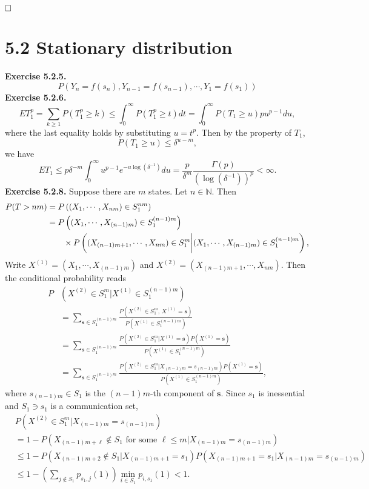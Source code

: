 \documentclass[12pt]{extarticle}
\begin{document}
$\hspace{\fill}\square$\\

\newpage
\section*{5.2 Stationary distribution}
\textbf{Exercise 5.2.5.}
\[
P(Y_n=f(s_n),Y_{n-1}=f(s_{n-1}),\cdots,Y_1=f(s_1))
\]
\textbf{Exercise 5.2.6.}
\[
ET_1^p=\sum_{k\geq 1}P(T_1^p\geq k)
\leq
\int_0^\infty P(T_1^p\geq t)dt
=
\int_0^\infty P(T_1\geq u)pu^{p-1}du,
\]
where the last equality holds by substituting $u=t^p$. 
Then by the property of $T_1$,
\[
P(T_1\geq u)\leq \delta^{u-m},
\]
we have
\[
ET_1\leq
p\delta^{-m}
\int_0^\infty
u^{p-1}e^{-u\log(\delta^{-1})}du
=
\frac{p}{\delta^m}\frac{\Gamma(p)}{\left(\log(\delta^{-1})\right)^p}<\infty.
\]
\textbf{Exercise 5.2.8.}
Suppose there are $m$ states. Let $n\in\mathbb{N}$. Then
\[
\begin{aligned}
P(T>nm)&=P\left((X_1,\cdots,X_{nm})\in S_1^{nm}\right) \\&
=P\left((X_1,\cdots,X_{(n-1)m})\in S_1^{(n-1)m}\right) \\&\hspace{7mm}
\times
P\left((X_{(n-1)m+1},\cdots,X_{nm})\in S_1^m
\bigg|
(X_1,\cdots,X_{(n-1)m})\in S_1^{(n-1)m}\right),
\end{aligned}
\]
Write $X^{(1)}=(X_1,\cdots,X_{(n-1)m})$ and $X^{(2)}=(X_{(n-1)m+1},\cdots,X_{nm})$. Then the conditional probability reads
\[
\begin{aligned}
P & \left(X^{(2)}\in S_1^m
\Big|
X^{(1)}\in S_1^{(n-1)m}\right) \\&
=\sum_{\mathbf{s}\in S_1^{(n-1)m}}
\frac{P\left(X^{(2)}\in S_1^m
,\,
X^{(1)}=\mathbf{s}\right)}
{P\left(X^{(1)}\in S_1^{(n-1)m}\right)} \\&
=
\sum_{\mathbf{s}\in S_1^{(n-1)m}}
\frac{P\left(X^{(2)}\in S_1^m
\Big|X^{(1)}=\mathbf{s}\right)
P\left(X^{(1)}=\mathbf{s}\right)}
{P\left(X^{(1)}\in S_1^{(n-1)m}\right)} \\&
=
\sum_{\mathbf{s}\in S_1^{(n-1)m}}
\frac{P\left(X^{(2)}\in S_1^m
\Big|X_{(n-1)m}=s_{(n-1)m}\right)
P\left(X^{(1)}=\mathbf{s}\right)}
{P\left(X^{(1)}\in S_1^{(n-1)m}\right)},
\end{aligned}
\]
where $s_{(n-1)m}\in S_1$ is the $(n-1)m$-th component of $\mathbf{s}$.
Since $s_1$ is inessential and $S_1\ni s_1$ is a communication set,
\[
\begin{aligned}
&P\left(X^{(2)}\in S_1^m \Big| X_{(n-1)m}=s_{(n-1)m}\right) \\&=
1-P\left(X_{(n-1)m+\ell}\notin S_1\text{ for some }\ell\leq m \Big| X_{(n-1)m}=s_{(n-1)m}\right) \\&\leq
1-P\left(
X_{(n-1)m+2}\notin S_1\Big| X_{(n-1)m+1}=s_1
\right)
P\left(
X_{(n-1)m+1}=s_1\Big| X_{(n-1)m}=s_{(n-1)m}
\right) \\&\leq
1-\left(
\sum_{j\notin S_1}p_{s_1,j}(1)
\right)
\min_{i\in S_1}p_{i,s_1}(1)<1.
\end{aligned}
\]
\end{document}
